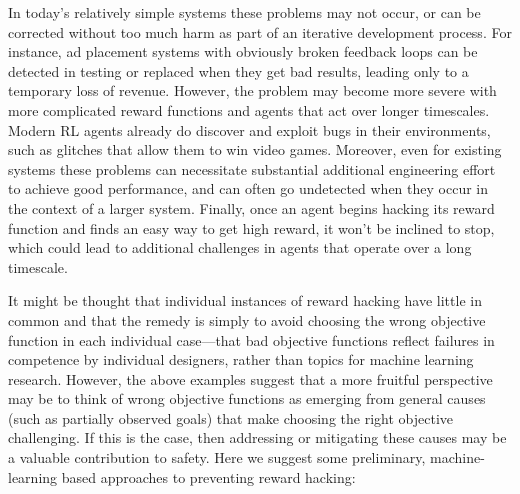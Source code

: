 \documentclass[a4paper,10pt]{article}
\begin{document}
In today’s relatively simple systems these problems may not occur, or can be corrected without too much harm as part of an iterative development process.  For instance, ad placement systems with obviously broken feedback loops can be detected in testing or replaced when they get bad results, leading only to a temporary loss of revenue.  However, the problem may become more severe with more complicated reward functions and agents that act over longer timescales.  Modern RL agents already do discover and exploit bugs in their environments, such as glitches that allow them to win video games. Moreover, even for existing systems these problems can necessitate substantial additional engineering effort to achieve good performance, and can often go undetected when they occur in the context of a larger system.  Finally, once an agent begins hacking its reward function and finds an easy way to get high reward, it won’t be inclined to stop, which could lead to additional challenges in agents that operate over a long timescale.

It might be thought that individual instances of reward hacking have little in common and that the remedy is simply to avoid choosing the wrong objective function in each individual case---that bad objective functions reflect failures in competence by individual designers, rather than topics for machine learning research.  However, the above examples suggest that a more fruitful perspective may be to think of wrong objective functions as emerging from general causes (such as partially observed goals) that make choosing the right objective challenging.  If this is the case, then addressing or mitigating these causes may be a valuable contribution to safety.  Here we suggest some preliminary, machine-learning based approaches to preventing reward hacking:
\end{document}
